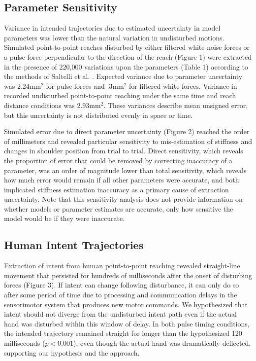 \subsection*{Parameter Sensitivity}
Variance in intended trajectories due to estimated uncertainty in model parameters was lower than the natural variation in undisturbed motions. Simulated point-to-point reaches disturbed by either filtered white noise forces or a pulse force perpendicular to the direction of the reach (Figure 1) were extracted in the presence of 220,000 variations upon the parameters (Table 1) according to the methods of Saltelli et al. \cite{saltelli2010variance}. Expected variance due to parameter uncertainty was $2.24 \mathrm{mm}^2$ for pulse forces and $.3 \mathrm{mm}^2$ for filtered white forces. Variance in recorded undisturbed point-to-point reaching under the same time and reach distance conditions was $2.93 \mathrm{mm}^2$. These variances describe mean unsigned error, but this uncertainty is not distributed evenly in space or time.

Simulated error due to direct parameter uncertainty (Figure 2) reached the order of millimeters and revealed particular sensitivity to mis-estimation of stiffness and changes in shoulder position from trial to trial. Direct sensitivity, which reveals the proportion of error that could be removed by correcting inaccuracy of a parameter, was an order of magnitude lower than total sensitivity, which reveals how much error would remain if all other parameters were accurate, and both implicated stiffness estimation inaccuracy as a primary cause of extraction uncertainty. Note that this sensitivity analysis does not provide information on whether models or parameter estimates are accurate, only how sensitive the model would be if they were inaccurate. 

\subsection*{Human Intent Trajectories}
Extraction of intent from human point-to-point reaching revealed straight-line movement that persisted for hundreds of milliseconds after the onset of disturbing forces (Figure 3). If intent can change following disturbance, it can only do so after some period of time due to processing and communication delays in the sensorimotor system that produces new motor commands. We hypothesized that intent should not diverge from the undisturbed intent path even if the actual hand was disturbed within this window of delay. In both pulse timing conditions, the intended trajectory remained straight for longer than the hypothesized 120 milliseconds ($p<0.001$), even though the actual hand was dramatically deflected, supporting our hypothesis and the approach. 

